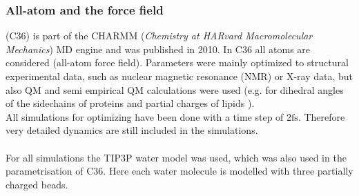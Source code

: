 \subsubsection{All-atom and the \charmm{} force field}
\charmm{} \autocites{charmm36_protein}{charmm36_lipids} (C36) is part of the CHARMM (\textit{Chemistry at HARvard Macromolecular Mechanics}) MD engine and was published in 2010. In C36 all atoms are considered (all-atom force field). Parameters were mainly optimized to structural experimental data, such as nuclear magnetic resonance (NMR) or X-ray data, but also QM and semi empirical QM calculations were used (e.g. for dihedral angles of the sidechains of proteins \autocite{charmm36_protein} and partial charges of lipids \autocite{charmm36_lipids}).\\
All simulations for optimizing have been done with a time step of 2$\si{\femto\second}$. Therefore very detailed dynamics are still included in the simulations.\\
\\
For all simulations the TIP3P water model \autocite{tip3p} was used, which was also used in the parametrisation of C36. Here each water molecule is modelled with three partially charged beads.
